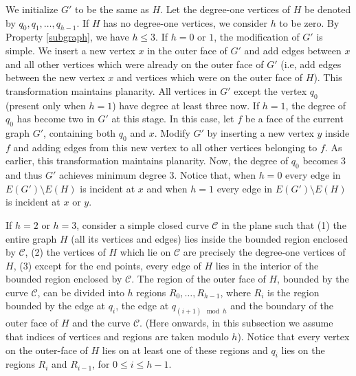 We initialize $G'$ to be the same as $H$. Let the degree-one vertices of $H$ be denoted by $q_0, q_1, \ldots, q_{h-1}$. If $H$ has no degree-one vertices, 
we consider $h$ to be zero. By Property \ref{subgraph}, we have $h \le 3$. If $h = 0$ or $1$, the modification of $G'$ is simple. We insert a new vertex 
$x$ in the outer face of $G'$ and add edges between $x$ and all other vertices which were already on the outer face of $G'$ (i.e, add edges between the 
new vertex $x$ and vertices which were on the outer face of $H$). This transformation maintains planarity. All vertices in $G'$ except the vertex $q_0$ (present only when $h=1$) have degree at least three now. If $h=1$, the degree of $q_0$ has become two in $G'$ at this stage. In this case, let $f$ be a 
face of the current graph $G'$, containing both $q_0$ and $x$. Modify $G'$ by inserting a new vertex $y$ inside $f$ and adding edges from this new vertex 
to all other vertices belonging to $f$. As earlier, this transformation maintains planarity. Now, the degree of $q_0$ becomes $3$ and thus $G'$ 
achieves minimum degree $3$. Notice that, when $h=0$ every edge in $E(G')\setminus E(H)$ is incident at $x$ and when $h=1$ every edge in 
$E(G')\setminus E(H)$ is incident at $x$ or $y$. 

If $h=2$ or $h=3$, consider a simple closed curve $\mathcal{C}$ in the plane such that 
(1) the entire graph $H$ (all its vertices and edges) lies inside the bounded region enclosed by $\mathcal{C}$, (2) 
the vertices of $H$ which lie on $\mathcal{C}$ are precisely the degree-one vertices of $H$,
(3) except for the end points, every edge of $H$ lies in the interior of the bounded region enclosed by $\mathcal{C}$. The region of the outer face 
of $H$, bounded by the curve $\mathcal{C}$, can be divided into $h$ regions $R_0,\ldots, R_{h-1}$, where $R_i$ is the region bounded by the edge at 
$q_{i}$, the edge at $q_{(i+1)\mod h}$ and the boundary of the outer face of $H$ and the curve $\mathcal{C}$. (Here onwards, in this subsection we 
assume that indices of vertices and regions are taken modulo $h$). Notice that every vertex on the outer-face of $H$ lies on at least one of these 
regions and $q_i$ lies on the regions $R_i$ and $R_{i-1}$, for $0 \le i \le h-1$. 


